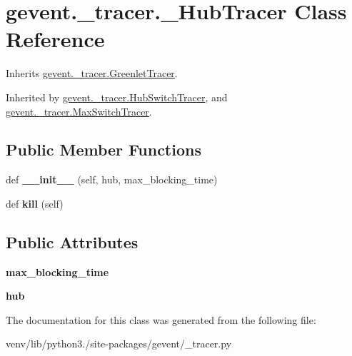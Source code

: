 \hypertarget{classgevent_1_1__tracer_1_1___hub_tracer}{}\section{gevent.\+\_\+tracer.\+\_\+\+Hub\+Tracer Class Reference}
\label{classgevent_1_1__tracer_1_1___hub_tracer}


Inherits \hyperlink{classgevent_1_1__tracer_1_1_greenlet_tracer}{gevent.\+\_\+tracer.\+Greenlet\+Tracer}.



Inherited by \hyperlink{classgevent_1_1__tracer_1_1_hub_switch_tracer}{gevent.\+\_\+tracer.\+Hub\+Switch\+Tracer}, and \hyperlink{classgevent_1_1__tracer_1_1_max_switch_tracer}{gevent.\+\_\+tracer.\+Max\+Switch\+Tracer}.

\subsection*{Public Member Functions}
\begin{DoxyCompactItemize}
\item 
\mbox{\label{classgevent_1_1__tracer_1_1___hub_tracer_a35d4fce4df974eff32cbc831d8daabc3}} 
def {\bfseries \+\_\+\+\_\+init\+\_\+\+\_\+} (self, hub, max\+\_\+blocking\+\_\+time)
\item 
\mbox{\label{classgevent_1_1__tracer_1_1___hub_tracer_abbed8725f70d8fe2586dc0ebbcb71e94}} 
def {\bfseries kill} (self)
\end{DoxyCompactItemize}
\subsection*{Public Attributes}
\begin{DoxyCompactItemize}
\item 
\mbox{\label{classgevent_1_1__tracer_1_1___hub_tracer_a4ce44c96b825a470914962cf63e5753f}} 
{\bfseries max\+\_\+blocking\+\_\+time}
\item 
\mbox{\label{classgevent_1_1__tracer_1_1___hub_tracer_abd2f7ba32175dfae1d7a6766a372a453}} 
{\bfseries hub}
\end{DoxyCompactItemize}


The documentation for this class was generated from the following file\+:\begin{DoxyCompactItemize}
\item 
venv/lib/python3./site-\/packages/gevent/\+\_\+tracer.\+py\end{DoxyCompactItemize}
